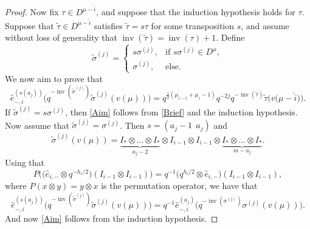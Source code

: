 \documentclass[pdftex]{sigma}
\numberwithin{equation}{section}
\DeclareMathOperator{\inv}{inv}
\begin{document}
\begin{proof}
Now fix $\tau \in D^{\mu - \hat{i}}$, and suppose that the induction hypothesis holds for $\tau$. Suppose that $\tilde{\tau} \in D^{\mu - \hat{i}}$ satisfies $\tilde{\tau}=s\tau$ for some transposition $s$, and assume without loss of generality that $\inv(\tilde{\tau}) = \inv(\tau) + 1$. Define
\[
\tilde{\sigma}^{(j)}
=
\begin{cases}
s \sigma^{(j)}, & \text{if } s \sigma^{(j)} \in D^{\mu}, \\
\sigma^{(j)}, & \text{else. }
\end{cases}
\]
We now aim to prove that
\begin{equation}\label{Aim}
\hat{e}^{(s(a_j))}_{-,i}\big(q^{-\inv(\tilde{\sigma}^{(j)})} \tilde{\sigma}^{(j)}(v(\mu)) \big) = q^{\frac{1}{2}(\mu_{i-1}+\mu_i-1)} q^{-2j} q^{-\inv(\tilde{\tau})} \tilde{\tau}\big(v\big(\mu- \hat{i}\big)\big).
\end{equation}
If $\tilde{\sigma}^{(j)} = s\sigma^{(j)}$, then \eqref{Aim} follows from \eqref{Brief} and the induction hypothesis. Now assume that $\tilde{\sigma}^{(j)} = \sigma^{(j)}$. Then $s= (a_j-1 \ \ a_j)$ and
\[
\tilde{\sigma}^{(j)} ( v(\mu) ) = \underbrace{I_* \otimes \dots \otimes I_* }_{a_j-2} \otimes I_{i-1} \otimes I_{i-1} \otimes \underbrace{I_* \otimes \dots \otimes I_*}_{m-a_j}.
\]
Using that
\[
 P \big( \big(\hat{e}_{i,-} \otimes q^{-h_i/2}\big)(I_{i-1} \otimes I_{i-1}) \big) = q^{-1}\big(q^{h_i/2} \otimes \hat{e}_{i,-}\big)(I_{i-1} \otimes I_{i-1}) ,
\]
where $P(x\otimes y)=y\otimes x$ is the permutation operator, we have that
\[
\hat{e}^{(s(a_j))}_{-,i}\big(q^{-\inv(\tilde{\sigma}^{(j)})} \tilde{\sigma}^{(j)}(v(\mu)) \big) = q^{-1}\hat{e}^{(a_j)}_{-,i}\big(q^{-\inv({\sigma}^{(j)})} {\sigma}^{(j)}(v(\mu)) \big).
\]
And now \eqref{Aim} follows from the induction hypothesis.
\end{proof}
\end{document}

